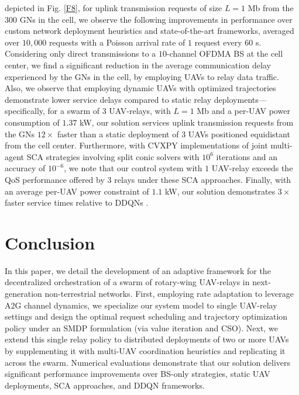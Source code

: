 \documentclass[10pt,twocolumn]{IEEEtran}
\begin{document}
 depicted in Fig. \ref{F8}, for uplink transmission requests of size $L{=}1$ Mb from the $300$ GNs in the cell, we observe the following improvements in performance over custom network deployment heuristics and state-of-the-art frameworks, averaged over $10,000$ requests with a Poisson arrival rate of $1$ request every $60$ s. Considering only direct transmissions to a $10$-channel OFDMA BS at the cell center, we find a significant reduction in the average communication delay experienced by the GNs in the cell, by employing UAVs to relay data traffic. Also, we observe that employing dynamic UAVs with optimized trajectories demonstrate lower service delays compared to static relay deployments---specifically, for a swarm of $3$ UAV-relays, with $L{=}1$ Mb and a per-UAV power consumption of $1.37$ kW, our solution services uplink transmission requests from the GNs $12{\times}$ faster than a static deployment of $3$ UAVs positioned equidistant from the cell center. Furthermore, with CVXPY implementations of joint multi-agent SCA strategies \cite{SCA, CSCA-ADMM} involving split conic solvers with $10^{6}$ iterations and an accuracy of $10^{-6}$, we note that our control system with $1$ UAV-relay exceeds the QoS performance offered by $3$ relays under these SCA approaches. Finally, with an average per-UAV power constraint of $1.1$ kW, our solution demonstrates $3{\times}$ faster service times relative to DDQNs \cite{DDQN}.

\vspace{-6mm}
\section{Conclusion}\label{VI}
In this paper, we detail the development of an adaptive framework for the decentralized orchestration of a swarm of rotary-wing UAV-relays in next-generation non-terrestrial networks. First, employing rate adaptation to leverage A2G channel dynamics, we specialize our system model to single UAV-relay settings and design the optimal request scheduling and trajectory optimization policy under an SMDP formulation (via value iteration and CSO). Next, we extend this single relay policy to distributed deployments of two or more UAVs by supplementing it with multi-UAV coordination heuristics and replicating it across the swarm. Numerical evaluations demonstrate that our solution delivers significant performance improvements over BS-only strategies, static UAV deployments, SCA approaches, and DDQN frameworks.

\vspace{-5mm}


\end{document}
